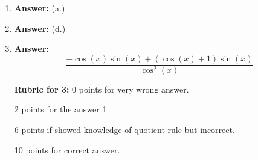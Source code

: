 \documentclass[11pt, reqno]{article}
\theoremstyle{plain}
\theoremstyle{definition}
\theoremstyle{remark}
\begin{document}
\begin{enumerate}
    \item[1.] \textbf{Answer:} (a.)
    \item[] \textbf{Answer:} (d.)
    \item[] \textbf{Answer:} 
    \[
        \frac{-\cos(x)\sin(x) + (\cos(x) + 1)\sin(x)}{\cos^2(x)}
    \]

    \textbf{Rubric for 3:} 0 points for very wrong answer. 

    2 points for the answer 1

    6 points if showed knowledge of quotient rule but incorrect.

    10 points for correct answer.
    
\end{enumerate}
\end{document}
